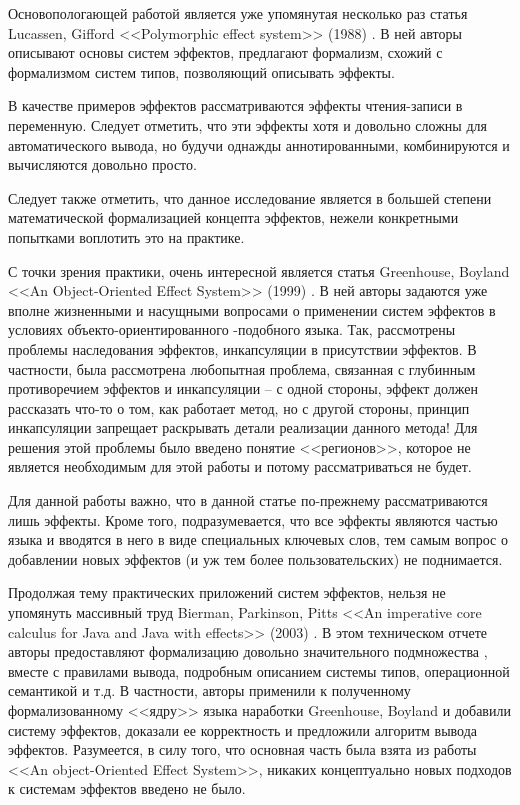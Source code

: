 \bigskip

Основопологающей работой является уже упомянутая несколько раз статья Lucassen, Gifford <<Polymorphic effect system>> (1988) \cite{Luc88}. В ней авторы описывают основы систем эффектов, предлагают формализм, схожий с формализмом систем типов, позволяющий описывать эффекты.

В качестве примеров эффектов рассматриваются эффекты  чтения-записи в переменную. Следует отметить, что эти эффекты хотя и довольно сложны для автоматического вывода, но будучи однажды аннотированными, комбинируются и вычисляются довольно просто. 

Следует также отметить, что данное исследование является в большей степени математической формализацией концепта эффектов, нежели конкретными попытками воплотить это на практике.

С точки зрения практики, очень интересной является статья Greenhouse, Boyland <<An Object-Oriented Effect System>> (1999) \cite{Green99}. В ней авторы задаются уже вполне жизненными и насущными вопросами о применении систем эффектов в условиях объекто-ориентированного -подобного языка. Так, рассмотрены проблемы наследования эффектов, инкапсуляции в присутствии эффектов. В частности, была рассмотрена любопытная проблема, связанная с глубинным противоречием эффектов и инкапсуляции -- с одной стороны, эффект должен рассказать что-то о том, как работает метод, но с другой стороны, принцип инкапсуляции запрещает раскрывать детали реализации данного метода! Для решения этой проблемы было введено понятие <<регионов>>, которое не является необходимым для этой работы и потому рассматриваться не будет.

Для данной работы важно, что в данной статье по-прежнему рассматриваются лишь  эффекты. Кроме того, подразумевается, что все эффекты являются частью языка и вводятся в него в виде специальных ключевых слов, тем самым вопрос о добавлении новых эффектов (и уж тем более пользовательских) не поднимается.

Продолжая тему практических приложений систем эффектов, нельзя не упомянуть массивный труд Bierman, Parkinson, Pitts <<An imperative core calculus for Java and Java with effects>> (2003) \cite{Bierman03}. В этом техническом отчете авторы предоставляют формализацию довольно значительного подмножества , вместе с правилами вывода, подробным описанием системы типов, операционной семантикой и т.д. В частности, авторы применили к полученному формализованному <<ядру>> языка наработки Greenhouse, Boyland и добавили систему эффектов, доказали ее корректность и предложили алгоритм вывода эффектов. Разумеется, в силу того, что основная часть была взята из работы <<An object-Oriented Effect System>>, никаких концептуально новых подходов к системам эффектов введено не было.

